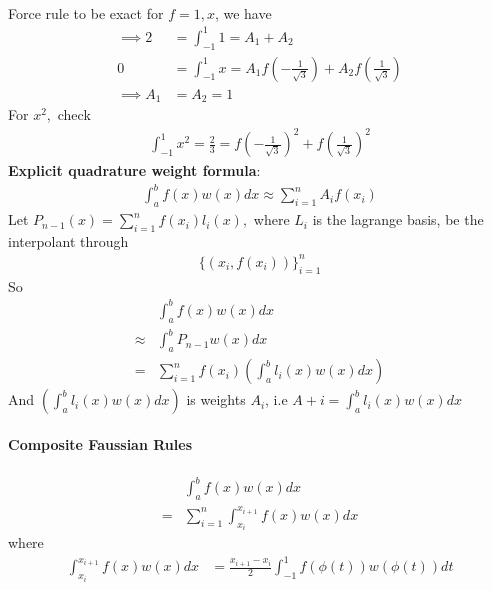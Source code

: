 \documentclass[11pt,oneside]{book}
\theoremstyle{break}
\theoremstyle{break}
\begin{document}
\hfill\\
Force rule to be exact for $f=1,x$, we have \begin{align*}
\implies 2&=\int_{-1}^{1}1 = A_1+A_2\\
0&=\int_{-1}^{1}x= A_{1}f\left(-\frac{1}{\sqrt{3}} \right)+A_2f\left(\frac{1}{\sqrt{3}} \right)\\
\implies A_1&=A_2=1
\end{align*}
For $x^2,$ check \begin{align*}
\int_{-1}^{1}x^2=\frac{2}{3}=f\left(-\frac{1}{\sqrt{3}} \right)^2+f\left(\frac{1}{\sqrt{3}} \right)^2
\end{align*}
\textbf{Explicit quadrature weight formula}:\begin{align*}
\int_{a}^{b}f(x)w(x)dx\approx \sum_{i=1}^n A_if(x_i)
\end{align*}
Let $P_{n-1}(x)=\sum_{i=1}^nf(x_i)l_i(x),$ where $L_i$ is the lagrange basis, be the interpolant through \begin{align*}
\{(x_i,f(x_i))\}^n_{i=1}
\end{align*}
So \begin{align*}
&\int_{a}^{b}f(x)w(x)dx\\
\approx& \int_{a}^{b}P_{n-1}w(x)dx\\
=&\sum_{i=1}^nf(x_i)\left(\int_{a}^{b}l_i(x)w(x) dx \right)
\end{align*}
And $\left(\int_{a}^{b}l_i(x)w(x) dx \right)$ is weights $A_i$, i.e $A+i=\int_{a}^{b}l_i(x)w(x)dx$\\
\hfill\\
\textbf{Composite Faussian Rules}\\
\hfill\\
\begin{align*}
&\int_{a}^{b}f(x)w(x)dx\\
=&\sum_{i=1}^n\int_{x_i}^{x_{i+1}}f(x)w(x)dx
\end{align*}
where \begin{align*}
\int_{x_i}^{x_{i+1}}f(x)w(x)dx&=\frac{x_{i+1}-x_{i}}{2}\int_{-1}^{1}f(\phi(t))w(\phi(t))dt
\end{align*}
\end{document}
